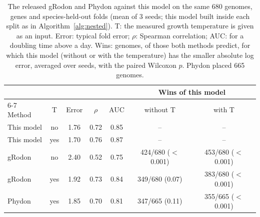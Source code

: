 \begin{table}[t]\centering\footnotesize\setlength{\tabcolsep}{3pt}
\caption{The released gRodon and Phydon against this model on the same 680 genomes, genes and species-held-out folds (mean of 3 seeds; this model built inside each split as in Algorithm~\ref{alg:nested}). T: the measured growth temperature is given as an input. Error: typical fold error; $\rho$: Spearman correlation; AUC: for a doubling time above a day. Wins: genomes, of those both methods predict, for which this model (without or with the temperature) has the smaller absolute log error, averaged over seeds, with the paired Wilcoxon $p$. Phydon placed 665 genomes.}\label{tab:released}
\begin{tabular}{@{}lccccc@{\hspace{4pt}}c@{}}
\toprule
& & & & & \multicolumn{2}{c}{Wins of this model} \\
\cmidrule(lr){6-7}
Method & T & Error & $\rho$ & AUC & without T & with T \\
\midrule
This model & no & 1.76 & 0.72 & 0.85 & -- & -- \\
This model & yes & 1.70 & 0.76 & 0.87 & -- & -- \\
gRodon & no & 2.40 & 0.52 & 0.75 & 424/680 ($<$0.001) & 453/680 ($<$0.001) \\
gRodon & yes & 1.92 & 0.73 & 0.84 & 349/680 (0.07) & 383/680 ($<$0.001) \\
Phydon & yes & 1.85 & 0.70 & 0.81 & 347/665 (0.11) & 355/665 ($<$0.001) \\
\bottomrule
\end{tabular}
\end{table}
